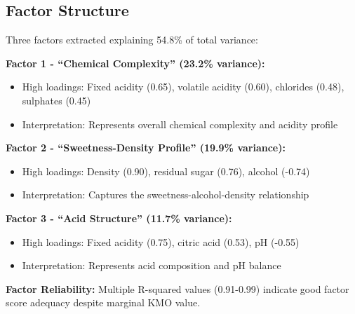 \subsection{Factor Structure}
Three factors extracted explaining 54.8\% of total variance:

\textbf{Factor 1 - ``Chemical Complexity'' (23.2\% variance):}
\begin{itemize}
\item High loadings: Fixed acidity (0.65), volatile acidity (0.60), chlorides (0.48), sulphates (0.45)
\item Interpretation: Represents overall chemical complexity and acidity profile
\end{itemize}

\textbf{Factor 2 - ``Sweetness-Density Profile'' (19.9\% variance):}
\begin{itemize}
\item High loadings: Density (0.90), residual sugar (0.76), alcohol (-0.74)
\item Interpretation: Captures the sweetness-alcohol-density relationship
\end{itemize}

\textbf{Factor 3 - ``Acid Structure'' (11.7\% variance):}
\begin{itemize}
\item High loadings: Fixed acidity (0.75), citric acid (0.53), pH (-0.55)
\item Interpretation: Represents acid composition and pH balance
\end{itemize}

\textbf{Factor Reliability:} Multiple R-squared values (0.91-0.99) indicate good factor score adequacy despite marginal KMO value.